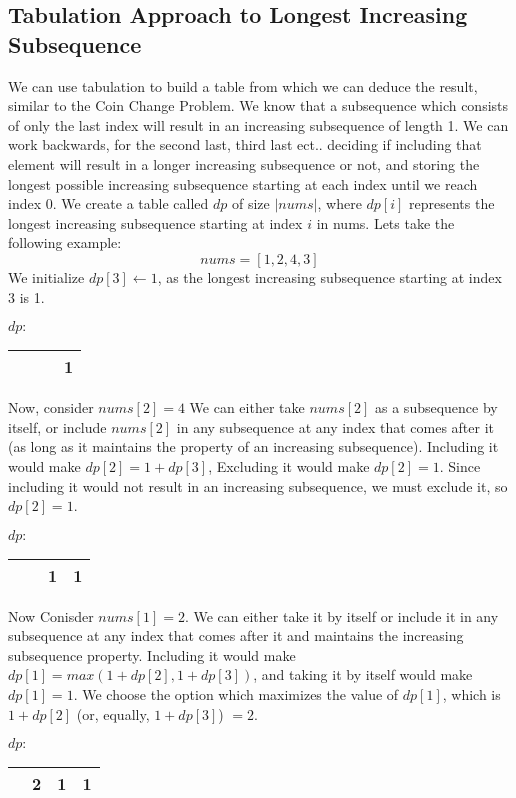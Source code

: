 \subsection{Tabulation Approach to Longest Increasing Subsequence}
We can use tabulation to build a table from which we can deduce the result, similar to the Coin Change Problem.
We know that a subsequence which consists of only the last index will result in an increasing subsequence of length 1.
We can work backwards, for the second last, third last ect.. deciding if including that element will result in a longer increasing subsequence or not,
and storing the longest possible increasing subsequence starting at each index until we reach index 0.
We create a table called $dp$ of size $|nums|$, where $dp[i]$ represents the longest increasing subsequence starting at index $i$ in nums.
Lets take the following example:$$nums = [1,2,4,3]$$
We initialize $dp[3] \leftarrow 1$, as the longest increasing subsequence starting at index 3 is 1.
\begin{table}[H]
    \centering
    $dp:$
    \begin{tabular}{|c|c|c|c|}
        \hline
        \phantom{0} & \phantom{0} & \phantom{0} & 1 \\
        \hline
    \end{tabular}
\end{table}
Now, consider $nums[2] = 4$
We can either take $nums[2]$ as a subsequence by itself, or include $nums[2]$ in any subsequence at any index that comes after it (as long as it maintains the property of an increasing subsequence).
Including it would make $dp[2] = 1+dp[3]$,
Excluding it would make $dp[2] = 1$.
Since including it would not result in an increasing subsequence, we must exclude it, so $dp[2] = 1$.
\begin{table}[H]
    \centering
    $dp:$
    \begin{tabular}{|c|c|c|c|}
        \hline
        \phantom{0} & \phantom{0} & 1 & 1 \\
        \hline
    \end{tabular}
\end{table}
Now Conisder $nums[1] = 2$.
We can either take it by itself or include it in any subsequence at any index that comes after it and maintains the increasing subsequence property.
Including it would make $dp[1] = max(1+dp[2], 1+dp[3])$, and taking it by itself would make $dp[1] = 1$.
We choose the option which maximizes the value of $dp[1]$, which is $1+dp[2]$ (or, equally, $1+dp[3]$) $= 2$.
\begin{table}[H]
    \centering
    $dp:$
    \begin{tabular}{|c|c|c|c|}
        \hline
        \phantom{0} & 2 & 1 & 1 \\
        \hline
    \end{tabular}
\end{table}
